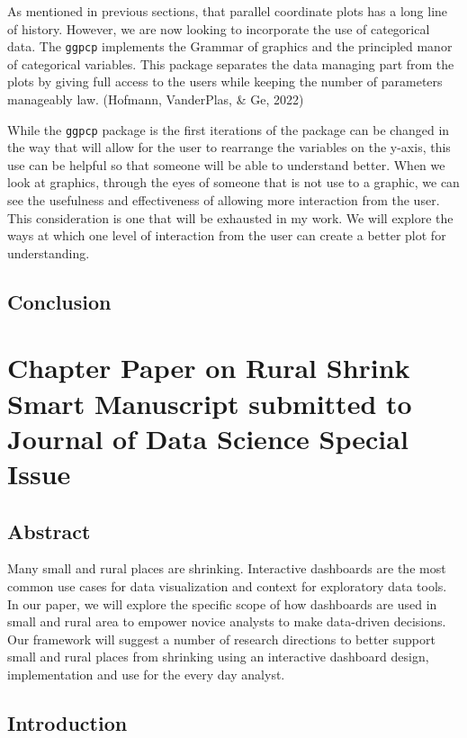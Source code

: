 \documentclass[print]{nuthesis}
\begin{document}
As mentioned in previous sections, that parallel coordinate plots has a long line of history. However, we are now looking to incorporate the use of categorical data. The \texttt{ggpcp} implements the Grammar of graphics and the principled manor of categorical variables. This package separates the data managing part from the plots by giving full access to the users while keeping the number of parameters manageably law. (Hofmann, VanderPlas, \& Ge, 2022)

While the \texttt{ggpcp} package is the first iterations of the package can be changed in the way that will allow for the user to rearrange the variables on the y-axis, this use can be helpful so that someone will be able to understand better. When we look at graphics, through the eyes of someone that is not use to a graphic, we can see the usefulness and effectiveness of allowing more interaction from the user. This consideration is one that will be exhausted in my work. We will explore the ways at which one level of interaction from the user can create a better plot for understanding.

\hypertarget{conclusion}{%
\section{Conclusion}\label{conclusion}}

\hypertarget{rmd-basics}{%
\chapter{Chapter Paper on Rural Shrink Smart Manuscript submitted to Journal of Data Science Special Issue}\label{rmd-basics}}

\hypertarget{abstract}{%
\section{Abstract}\label{abstract}}

Many small and rural places are shrinking. Interactive dashboards are the most common use cases for data visualization and context for exploratory data tools. In our paper, we will explore the specific scope of how dashboards are used in small and rural area to empower novice analysts to make data-driven decisions. Our framework will suggest a number of research directions to better support small and rural places from shrinking using an interactive dashboard design, implementation and use for the every day analyst.

\hypertarget{introduction-1}{%
\section{Introduction}\label{introduction-1}}
\end{document}
